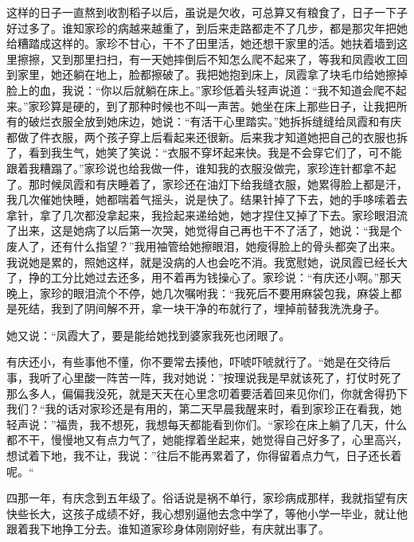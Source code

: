 \documentclass[12pt,UTF8]{ctexbook}
\begin{document}
这样的日子一直熬到收割稻子以后，虽说是欠收，可总算又有粮食了，日子一下子好过多了。谁知家珍的病越来越重了，到后来走路都走不了几步，都是那灾年把她给糟踏成这样的。家珍不甘心，干不了田里活，她还想干家里的活。她扶着墙到这里擦擦，又到那里扫扫，有一天她摔倒后不知怎么爬不起来了，等我和凤霞收工回到家里，她还躺在地上，脸都擦破了。我把她抱到床上，凤霞拿了块毛巾给她擦掉脸上的血，我说：“你以后就躺在床上。”家珍低着头轻声说道：“我不知道会爬不起来。”家珍算是硬的，到了那种时候也不叫一声苦。她坐在床上那些日子，让我把所有的破烂衣服全放到她床边，她说：“有活干心里踏实。”她拆拆缝缝给凤霞和有庆都做了件衣服，两个孩子穿上后看起来还很新。后来我才知道她把自己的衣服也拆了，看到我生气，她笑了笑说：“衣服不穿坏起来快。我是不会穿它们了，可不能跟着我糟蹋了。”家珍说也给我做一件，谁知我的衣服没做完，家珍连针都拿不起了。那时候凤霞和有庆睡着了，家珍还在油灯下给我缝衣服，她累得脸上都是汗，我几次催她快睡，她都喘着气摇头，说是快了。结果针掉了下去，她的手哆嗦着去拿针，拿了几次都没拿起来，我捡起来递给她，她才捏住又掉了下去。家珍眼泪流了出来，这是她病了以后第一次哭，她觉得自己再也干不了活了，她说：“我是个废人了，还有什么指望？”我用袖管给她擦眼泪，她瘦得脸上的骨头都突了出来。我说她是累的，照她这样，就是没病的人也会吃不消。我宽慰她，说凤霞已经长大了，挣的工分比她过去还多，用不着再为钱操心了。家珍说：“有庆还小啊。”那天晚上，家珍的眼泪流个不停，她几次嘱咐我：“我死后不要用麻袋包我，麻袋上都是死结，我到了阴间解不开，拿一块干净的布就行了，埋掉前替我洗洗身子。

她又说：“凤霞大了，要是能给她找到婆家我死也闭眼了。

有庆还小，有些事他不懂，你不要常去揍他，吓唬吓唬就行了。“她是在交待后事，我听了心里酸一阵苦一阵，我对她说：”按理说我是早就该死了，打仗时死了那么多人，偏偏我没死，就是天天在心里念叨着要活着回来见你们，你就舍得扔下我们？“我的话对家珍还是有用的，第二天早晨我醒来时，看到家珍正在看我，她轻声说：”福贵，我不想死，我想每天都能看到你们。“家珍在床上躺了几天，什么都不干，慢慢地又有点力气了，她能撑着坐起来，她觉得自己好多了，心里高兴，想试着下地，我不让，我说：”往后不能再累着了，你得留着点力气，日子还长着呢。“

四那一年，有庆念到五年级了。俗话说是祸不单行，家珍病成那样，我就指望有庆快些长大，这孩子成绩不好，我心想别逼他去念中学了，等他小学一毕业，就让他跟着我下地挣工分去。谁知道家珍身体刚刚好些，有庆就出事了。
\end{document}
